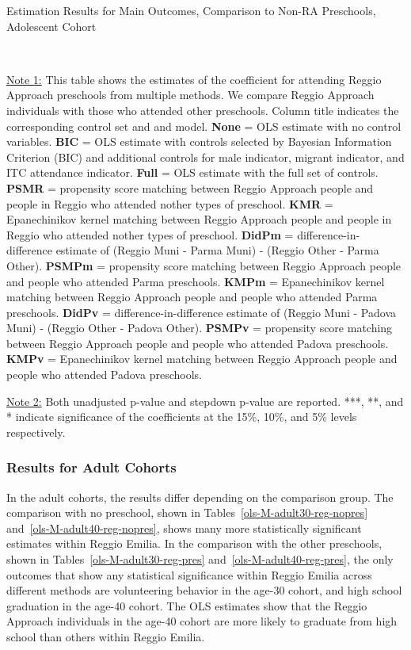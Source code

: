 \begin{table}[H] \caption{Estimation Results for Main Outcomes, Comparison to Non-RA Preschools, Adolescent Cohort} \label{ols-M-adol-reg-pres}
\scalebox{0.6}{}
\vspace{1ex} \\
\footnotesize\raggedright{\underline{Note 1:} This table shows the estimates of the coefficient for attending Reggio Approach preschools from multiple methods. We compare Reggio Approach individuals with those who attended other preschools. Column title indicates the corresponding control set and and model. \textbf{None} = OLS estimate with no control variables. \textbf{BIC} = OLS estimate with controls selected by Bayesian Information Criterion (BIC) and additional controls for male indicator, migrant indicator, and ITC attendance indicator. \textbf{Full} = OLS estimate with the full set of controls. \textbf{PSMR} =  propensity score matching between Reggio Approach people and people in Reggio who attended nother types of preschool. \textbf{KMR} = Epanechinikov kernel matching between Reggio Approach people and people in Reggio who attended nother types of preschool. \textbf{DidPm} = difference-in-difference estimate of (Reggio Muni - Parma Muni) - (Reggio Other - Parma Other). \textbf{PSMPm} = propensity score matching between Reggio Approach people and people who attended Parma preschools. \textbf{KMPm} = Epanechinikov kernel matching between Reggio Approach people and people who attended Parma preschools. \textbf{DidPv} = difference-in-difference estimate of (Reggio Muni - Padova Muni) - (Reggio Other - Padova Other). \textbf{PSMPv} = propensity score matching between Reggio Approach people and people who attended Padova preschools. \textbf{KMPv} = Epanechinikov kernel matching between Reggio Approach people and people who attended Padova preschools.}

\footnotesize\raggedright{\underline{Note 2:} Both unadjusted p-value and stepdown p-value are reported. ***, **, and * indicate significance of the coefficients at the 15\%, 10\%, and 5\% levels respectively.}
\end{table}



\subsubsection{Results for Adult Cohorts}
In the adult cohorts, the results differ depending on the comparison group. The comparison with no preschool, shown in Tables~\ref{ols-M-adult30-reg-nopres} and~\ref{ols-M-adult40-reg-nopres}, shows many more statistically significant estimates within Reggio Emilia. In the comparison with the other preschools, shown in Tables~\ref{ols-M-adult30-reg-pres} and~\ref{ols-M-adult40-reg-pres}, the only outcomes that show any statistical significance within Reggio Emilia across different methods are volunteering behavior in the age-30 cohort, and high school graduation in the age-40 cohort. The OLS estimates show that the Reggio Approach individuals in the age-40 cohort are more likely to graduate from high school than others within Reggio Emilia.

